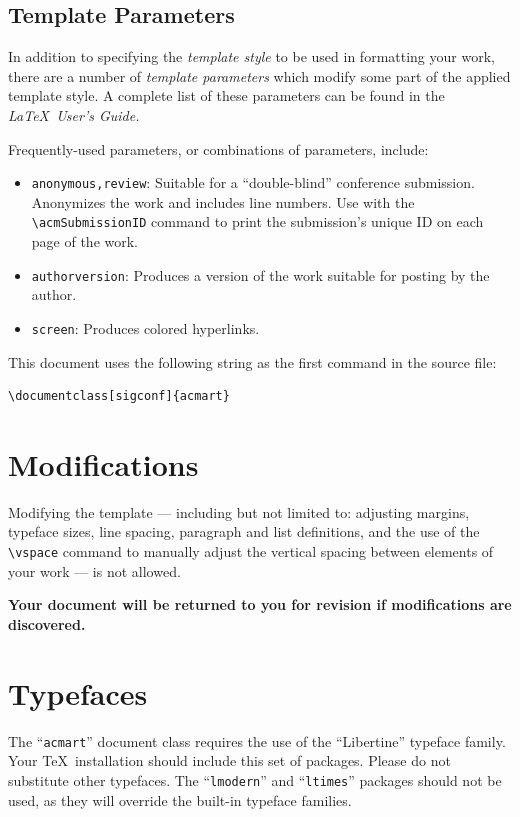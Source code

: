 \documentclass[sigconf,nonacm=true]{acmart}
\begin{document}
\subsection{Template Parameters}

In addition to specifying the {\itshape template style} to be used in
formatting your work, there are a number of {\itshape template parameters}
which modify some part of the applied template style. A complete list
of these parameters can be found in the {\itshape \LaTeX\ User's Guide.}

Frequently-used parameters, or combinations of parameters, include:
\begin{itemize}
\item {\verb|anonymous,review|}: Suitable for a ``double-blind''
  conference submission. Anonymizes the work and includes line
  numbers. Use with the \verb|\acmSubmissionID| command to print the
  submission's unique ID on each page of the work.
\item{\verb|authorversion|}: Produces a version of the work suitable
  for posting by the author.
\item{\verb|screen|}: Produces colored hyperlinks.
\end{itemize}

This document uses the following string as the first command in the
source file:
\begin{verbatim}
\documentclass[sigconf]{acmart}
\end{verbatim}

\section{Modifications}

Modifying the template --- including but not limited to: adjusting
margins, typeface sizes, line spacing, paragraph and list definitions,
and the use of the \verb|\vspace| command to manually adjust the
vertical spacing between elements of your work --- is not allowed.

{\bfseries Your document will be returned to you for revision if
  modifications are discovered.}

\section{Typefaces}

The ``\verb|acmart|'' document class requires the use of the
``Libertine'' typeface family. Your \TeX\ installation should include
this set of packages. Please do not substitute other typefaces. The
``\verb|lmodern|'' and ``\verb|ltimes|'' packages should not be used,
as they will override the built-in typeface families.
\end{document}
